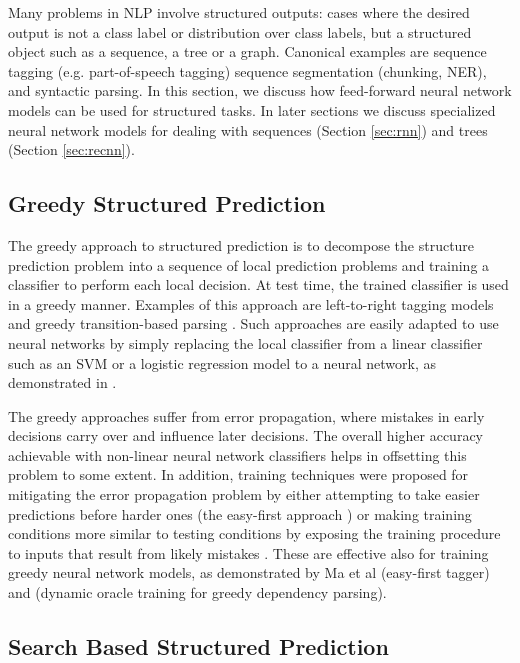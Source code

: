 \documentclass[jair,twoside,11pt,theapa]{article}
\begin{document}
{Many problems in NLP involve structured outputs: cases where the desired output
is not a class label or distribution over class labels, but a structured object
such as a sequence, a tree or a graph. Canonical examples are sequence tagging
(e.g. part-of-speech tagging) sequence segmentation (chunking, NER), and syntactic parsing.
In this section, we discuss how feed-forward neural network models can be used for structured tasks.
In later sections we discuss specialized neural network models for dealing with
sequences (Section \ref{sec:rnn}) and trees (Section \ref{sec:recnn}).

\subsection{Greedy Structured Prediction}

The greedy approach to structured prediction is to decompose the structure
prediction problem into a sequence of local prediction problems and training
a classifier to perform each local decision.  At test time, the trained
classifier is used in a greedy manner. Examples of this approach are
left-to-right tagging models \cite{gimenez2004svmtool} and greedy transition-based parsing \cite{nivre2008algorithms}.
Such approaches are easily adapted to use neural networks
by simply replacing the local classifier from a linear classifier such as an SVM
or a logistic regression model to a neural network, as demonstrated in \cite{chen2014fast,lewis2014improved}.

The greedy approaches suffer from error propagation, where mistakes in early
decisions carry over and influence later decisions.  The overall higher accuracy
achievable with non-linear neural network classifiers helps in offsetting this
problem to some extent.  In addition,
training techniques were proposed for mitigating the error
propagation problem by either attempting to take easier predictions before
harder ones (the easy-first approach \cite{goldberg2010efficient}) or making
training conditions more similar to testing conditions by exposing the
training procedure to inputs that result from likely mistakes
\cite{daume09searn,goldberg2013training}.  These are effective also for
training greedy neural network models, as demonstrated by Ma et al
\cite{ma2014tagging} (easy-first tagger) and \cite{in-submission} (dynamic
oracle training for greedy dependency parsing).

\subsection{Search Based Structured Prediction}

}
\end{document}
